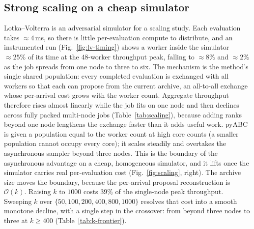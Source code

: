 \documentclass[10pt]{article}
\theoremstyle{plain}
\theoremstyle{definition}
\begin{document}
\subsection{Strong scaling on a cheap simulator}
Lotka--Volterra is an adversarial simulator for a scaling study. Each evaluation takes ${\approx}4$\,ms, so there is little per-evaluation compute to distribute, and an instrumented run (Fig.~\ref{fig:lv-timing}) shows a worker inside the simulator ${\approx}25\%$ of its time at the $48$-worker throughput peak, falling to ${\approx}8\%$ and ${\approx}2\%$ as the job spreads from one node to three to six. The mechanism is the method's single shared population: every completed evaluation is exchanged with all workers so that each can propose from the current archive, an all-to-all exchange whose per-arrival cost grows with the worker count. Aggregate throughput therefore rises almost linearly while the job fits on one node and then declines across fully packed multi-node jobs (Table~\ref{tab:scaling}), because adding ranks beyond one node lengthens the exchange faster than it adds useful work. pyABC is given a population equal to the worker count at high core counts (a smaller population cannot occupy every core); it scales steadily and overtakes the asynchronous sampler beyond three nodes. This is the boundary of the asynchronous advantage on a cheap, homogeneous simulator, and it lifts once the simulator carries real per-evaluation cost (Fig.~\ref{fig:scaling}, right). The archive size moves the boundary, because the per-arrival proposal reconstruction is $\mathcal{O}(k)$. Raising $k$ to $1000$ costs $39\%$ of the single-node peak throughput. Sweeping $k$ over $\{50,100,200,400,800,1000\}$ resolves that cost into a smooth monotone decline, with a single step in the crossover: from beyond three nodes to three at $k\ge400$ (Table~\ref{tab:k-frontier}).
\end{document}
